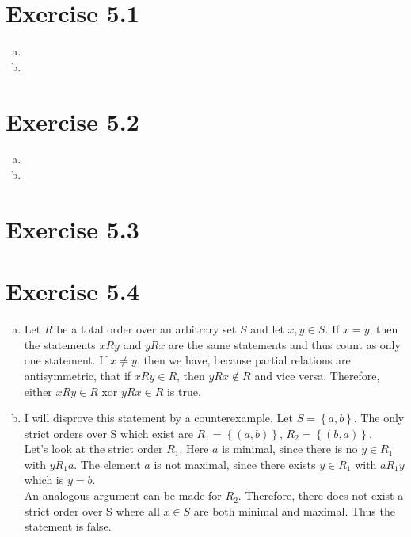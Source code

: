 \documentclass{article} %
\newcommand{\homeworkNumber}{5}
\begin{document}
\section*{Exercise \homeworkNumber.1}

\begin{enumerate}[(a)]
	\item
	\item
\end{enumerate}



\section*{Exercise \homeworkNumber.2}

\begin{enumerate}[(a)]
	\item
	\item
\end{enumerate}



\section*{Exercise \homeworkNumber.3}



\section*{Exercise \homeworkNumber.4}

\begin{enumerate}[(a)]
	\item Let \( R \) be a total order over an arbitrary set \( S \) and let \( x,y \in S \).
	      If \( x = y \), then the statements \( xRy  \) and \( yRx \) are the same statements and thus count as only one statement.
	      If \( x \neq y \), then we have, because partial relations are antisymmetric, that if \( xRy \in R\), then \( yRx \not\in R\) and vice versa.
	      Therefore, either \( xRy \in R \) xor \( yRx \in R \) is true.
	\item I will disprove this statement by a counterexample.
	      Let \( S = \left\{ a,b \right\}  \).
	      The only strict orders over S which exist are \( R_{1} = \left\{ (a,b) \right\}  \), \( R_{2} = \left\{ (b, a) \right\}  \). \\
	      Let's look at the strict order \( R_{1} \).
	      Here \( a \) is minimal, since there is no \( y \in R_{1} \) with \( yR_{1}a \).
	      The element \( a \) is not maximal, since there exists \( y \in R_{1} \) with \( aR_{1}y \) which is \( y = b \). \\
	      An analogous argument can be made for \( R_{2} \).
	      Therefore, there does not exist a strict order over S where all \( x \in S \) are both minimal and maximal. Thus the statement is false.

\end{enumerate}
\end{document}
